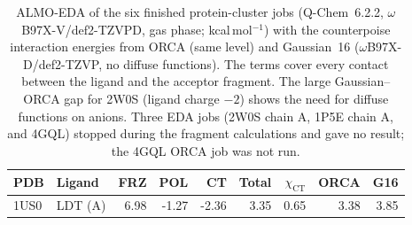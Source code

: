 \documentclass[journal=jcisd8,manuscript=suppinfo]{achemso}
\begin{document}
\begin{singlespace}
{}
\begin{table}[!htbp]\centering\small
\caption{ALMO-EDA of the six finished protein-cluster jobs (Q-Chem~6.2.2, $\omega$B97X-V/def2-TZVPD, gas phase; kcal\,mol$^{-1}$) with the counterpoise interaction energies from ORCA (same level) and Gaussian~16 ($\omega$B97X-D/def2-TZVP, no diffuse functions). The terms cover every contact between the ligand and the acceptor fragment. The large Gaussian--ORCA gap for 2W0S (ligand charge $-2$) shows the need for diffuse functions on anions. Three EDA jobs (2W0S chain A, 1P5E chain A, and 4GQL) stopped during the fragment calculations and gave no result; the 4GQL ORCA job was not run.}\label{tab:proteda}
\begin{tabular}{llrrrrrrr}\toprule PDB & Ligand & FRZ & POL & CT & Total & $\chi_\mathrm{CT}$ & ORCA & G16\\\midrule
1US0 & LDT (A) & 6.98 & -1.27 & -2.36 & 3.35 & 0.65 & 3.38 & 3.85\\

\end{tabular}
\end{table}
\end{singlespace}
\end{document}
